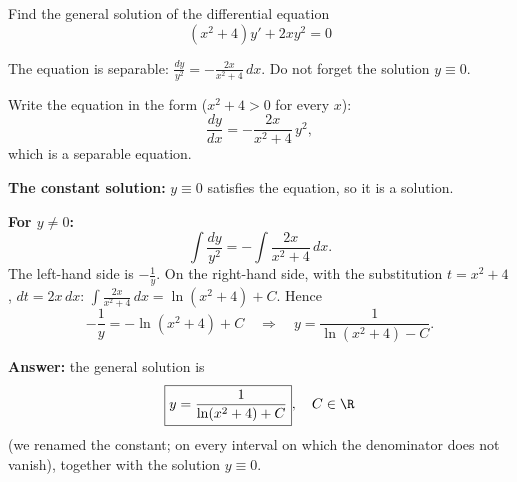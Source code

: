 
\begin{question}
Find the general solution of the differential equation
\[ (x^2 + 4)y' + 2xy^2 = 0 \]
\end{question}

\begin{hint}
The equation is separable: $\frac{dy}{y^2} = -\frac{2x}{x^2 + 4}\,dx$. Do not forget the solution $y \equiv 0$.
\end{hint}

\begin{solution}
Write the equation in the form ($x^2 + 4 > 0$ for every $x$):
\[ \frac{dy}{dx} = -\frac{2x}{x^2 + 4}\, y^2, \]
which is a separable equation.

\textbf{The constant solution:} $y \equiv 0$ satisfies the equation, so it is a solution.

\textbf{For $y \ne 0$:}
\[ \int \frac{dy}{y^2} = -\int \frac{2x}{x^2 + 4}\,dx. \]
The left-hand side is $-\frac1y$. On the right-hand side, with the substitution $t = x^2 + 4$, $dt = 2x\,dx$: $\int \frac{2x}{x^2 + 4}\,dx = \ln(x^2 + 4) + C$. Hence
\[ -\frac{1}{y} = -\ln(x^2 + 4) + C \quad\Longrightarrow\quad y = \frac{1}{\ln(x^2 + 4) - C}. \]

\textbf{Answer:} the general solution is
\[ \boxed{y = \frac{1}{\ln(x^2 + 4) + C}}, \quad C \in \R \]
(we renamed the constant; on every interval on which the denominator does not vanish), together with the solution $y \equiv 0$.
\end{solution}
